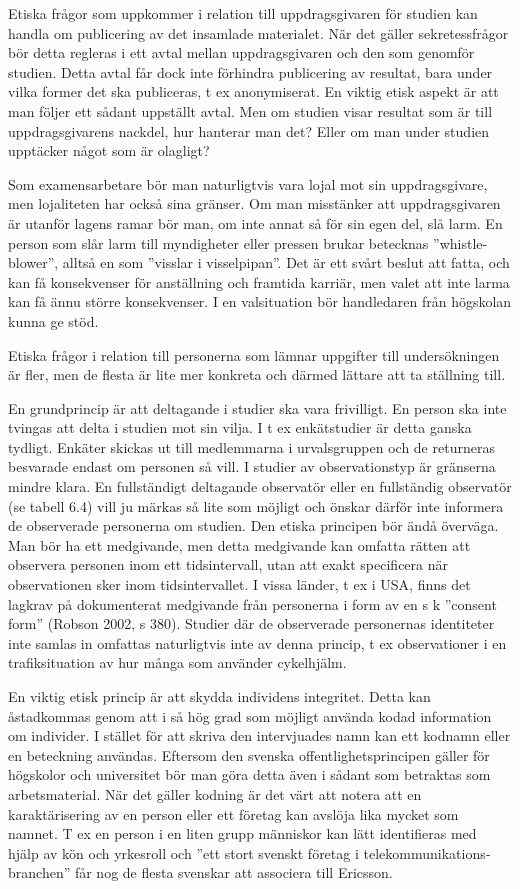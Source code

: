Etiska frågor som uppkommer i relation till uppdragsgivaren för studien
kan handla om publicering av det insamlade materialet. När det gäller
sekretessfrågor bör detta regleras i ett avtal mellan uppdragsgivaren
och den som genomför studien. Detta avtal får dock inte förhindra
publicering av resultat, bara under vilka former det ska publiceras, t
ex anonymiserat. En viktig etisk aspekt är att man följer ett sådant
uppställt avtal. Men om studien visar resultat som är till
uppdragsgivarens nackdel, hur hanterar man det? Eller om man under
studien upptäcker något som är olagligt?

Som examensarbetare bör man naturligtvis vara lojal mot sin
uppdragsgivare, men lojaliteten har också sina gränser. Om man
misstänker att uppdragsgivaren är utanför lagens ramar bör man, om inte
annat så för sin egen del, slå larm. En person som slår larm till
myndigheter eller pressen brukar betecknas ''whistle-blower'', alltså en
som ''visslar i visselpipan''. Det är ett svårt beslut att fatta, och
kan få konsekvenser för anställning och framtida karriär, men valet att
inte larma kan få ännu större konsekvenser. I en valsituation bör
handledaren från högskolan kunna ge stöd.

Etiska frågor i relation till personerna som lämnar uppgifter till
undersökningen är fler, men de flesta är lite mer konkreta och därmed
lättare att ta ställning till.

En grundprincip är att deltagande i studier ska vara frivilligt. En
person ska inte tvingas att delta i studien mot sin vilja. I t ex
enkätstudier är detta ganska tydligt. Enkäter skickas ut till
medlemmarna i urvalsgruppen och de returneras besvarade endast om
personen så vill. I studier av observationstyp är gränserna mindre
klara. En fullständigt deltagande observatör eller en fullständig
observatör (se tabell 6.4) vill ju märkas så lite som möjligt och önskar
därför inte informera de observerade personerna om studien. Den etiska
principen bör ändå överväga. Man bör ha ett medgivande, men detta
medgivande kan omfatta rätten att observera personen inom ett
tidsintervall, utan att exakt specificera när observationen sker inom
tidsintervallet. I vissa länder, t ex i USA, finns det lagkrav på
dokumenterat medgivande från personerna i form av en s k ''consent
form'' (Robson 2002, s 380). Studier där de observerade personernas
identiteter inte samlas in omfattas naturligtvis inte av denna princip,
t ex observationer i en trafiksituation av hur många som använder
cykelhjälm.

En viktig etisk princip är att skydda individens integritet. Detta kan
åstadkommas genom att i så hög grad som möjligt använda kodad
information om individer. I stället för att skriva den intervjuades namn
kan ett kodnamn eller en beteckning användas. Eftersom den svenska
offentlighetsprincipen gäller för högskolor och universitet bör man göra
detta även i sådant som betraktas som arbetsmaterial. När det gäller
kodning är det värt att notera att en karaktärisering av en person eller
ett företag kan avslöja lika mycket som namnet. T ex en person i en
liten grupp människor kan lätt identifieras med hjälp av kön och
yrkesroll och ''ett stort svenskt företag i
telekommunikations­branchen'' får nog de flesta svenskar att associera
till Ericsson.

